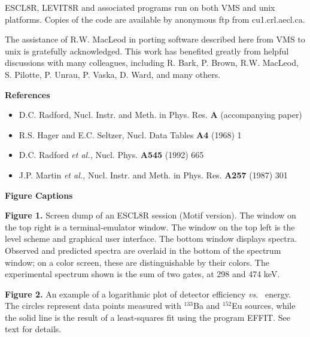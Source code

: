 ESCL8R, LEVIT8R and associated programs run on both VMS and unix platforms.
Copies of the code are available by anonymous ftp from cu1.crl.aecl.ca.

The assistance of R.W. MacLeod in porting software described here from VMS to
unix is gratefully acknowledged. This work has benefited greatly from helpful
discussions with many colleagues, including
R. Bark,
P. Brown,
R.W. MacLeod,
S. Pilotte,
P. Unrau,
P. Vaska,
D. Ward,
and many others.

\newpage
\begin{center}
{\bf                                References}
\end{center}

\begin{itemize}
\item[{[1]}] D.C. Radford, Nucl. Instr. and Meth. in Phys. Res. {\bf A}
    (accompanying paper)
\item[{[2]}] R.S. Hager and E.C. Seltzer, Nucl. Data Tables {\bf A4} (1968) 1
\item[{[3]}] D.C. Radford {\em et al.,} Nucl. Phys. {\bf A545} (1992) 665
\item[{[4]}] J.P. Martin {\em et al.,} Nucl. Instr. and Meth. in Phys. Res.
     {\bf A257} (1987) 301
\end{itemize}

\setlength{\parindent}{0mm}
\newpage
\begin{center}
{\bf                                Figure Captions}
\end{center}
\vspace{5mm}

{\bf Figure 1.} 
Screen dump of an ESCL8R session (Motif version).
The window on the top right is a terminal-emulator window. The window on the
top left is the level scheme and graphical user interface. The bottom window
displays spectra. Observed and predicted spectra are overlaid in the bottom of
the spectrum window; on a color screen, these are distinguishable by their
colors. The experimental spectrum shown is the sum of two gates, at 298 and 474
keV.
\vspace{5mm}

{\bf Figure 2.} 
An example of a logarithmic plot of detector efficiency {\em vs.} \ghray\
energy. The circles represent data points measured with $^{133}$Ba and
$^{152}$Eu sources, while the solid line is the result of a least-squares fit
using the program EFFIT. See text for details.
\vspace{5mm}


